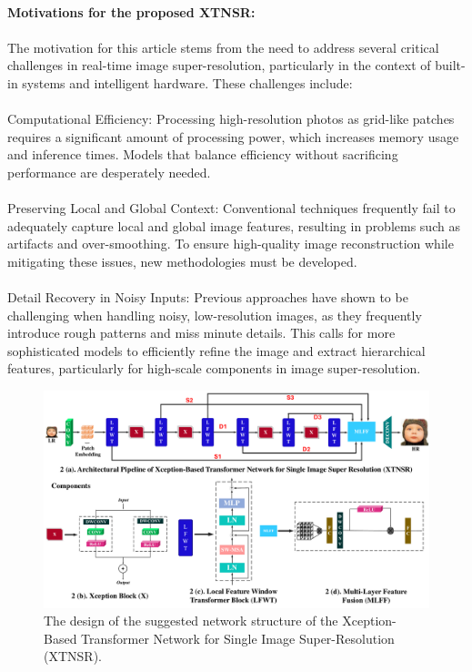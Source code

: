 \documentclass[twocolumn]{svjour3}          %
\begin{document}
\\
\textbf{Motivations for the proposed XTNSR:}\\
\\
The motivation for this article stems from the need to address several critical challenges in real-time image super-resolution, particularly in the context of built-in systems and intelligent hardware. These challenges include:\\
\\
Computational Efficiency: Processing high-resolution photos as grid-like patches requires a significant amount of processing power, which increases memory usage and inference times. Models that balance efficiency without sacrificing performance are desperately needed.\\
\\
Preserving Local and Global Context: Conventional techniques frequently fail to adequately capture local and global image features, resulting in problems such as artifacts and over-smoothing. To ensure high-quality image reconstruction while mitigating these issues, new methodologies must be developed.\\
\\
Detail Recovery in Noisy Inputs: Previous approaches have shown to be challenging when handling noisy, low-resolution images, as they frequently introduce rough patterns and miss minute details. This calls for more sophisticated models to efficiently refine the image and extract hierarchical features, particularly for high-scale components in image super-resolution.
\\

\begin{figure}
    \centering
    \includegraphics[width=\linewidth]{2Figure.pdf}
    \caption{The design of the suggested network structure of the Xception-Based Transformer Network for Single Image Super-Resolution (XTNSR).}
    \label{fig:2}
\end{figure}
\end{document}
